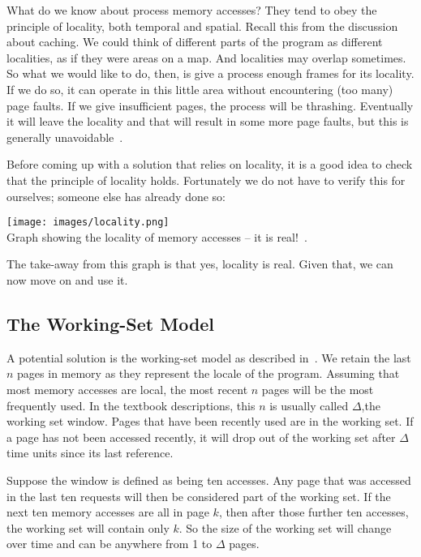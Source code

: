 What do we know about process memory accesses? They tend to obey the principle of locality, both temporal and spatial. Recall this from the discussion about caching. We could think of different parts of the program as different localities, as if they were areas on a map. And localities may overlap sometimes. So what we would like to do, then, is give a process enough frames for its locality. If we do so, it can operate in this little area without encountering (too many) page faults. If we give insufficient pages, the process will be thrashing. Eventually it will leave the locality and that will result in some more page faults, but this is generally unavoidable~\cite{osc}.  

Before coming up with a solution that relies on locality, it is a good idea to check that the principle of locality holds. Fortunately we do not have to verify this for ourselves; someone else has already done so:

\begin{center}
\texttt{[image: images/locality.png]}\\
Graph showing the locality of memory accesses -- it is real!~\cite{locality}.
\end{center}

The take-away from this graph is that yes, locality is real. Given that, we can now move on and use it.


\subsection*{The Working-Set Model}

A potential solution is the working-set model as described in~\cite{osc}. We retain the last $n$ pages in memory as they represent the locale of the program. Assuming that most memory accesses are local, the most recent $n$ pages will be the most frequently used. In the textbook descriptions, this $n$ is usually called $\Delta$,the working set window. Pages that have been recently used are in the working set. If a page has not been accessed recently, it will drop out of the working set after $\Delta$ time units since its last reference. 

Suppose the window is defined as being ten accesses. Any page that was accessed in the last ten requests will then be considered part of the working set. If the next ten memory accesses are all in page $k$, then after those further ten accesses, the working set will contain only $k$. So the size of the working set will change over time and can be anywhere from 1 to $\Delta$ pages.

